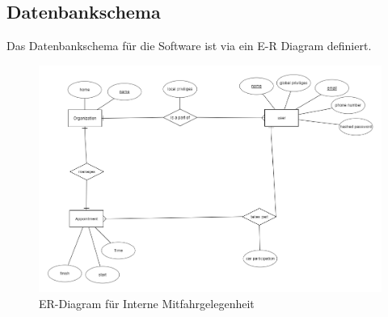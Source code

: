 \documentclass[11pt,a4paper]{article}
\begin{document}
\subsection{Datenbankschema}
Das Datenbankschema für die Software ist via ein E-R Diagram definiert.\\
\begin{figure}[!htb]
\includegraphics[width=\textwidth]{ER_Diagram.png}
\caption{ER-Diagram für Interne Mitfahrgelegenheit}
\end{figure}
\end{document}
